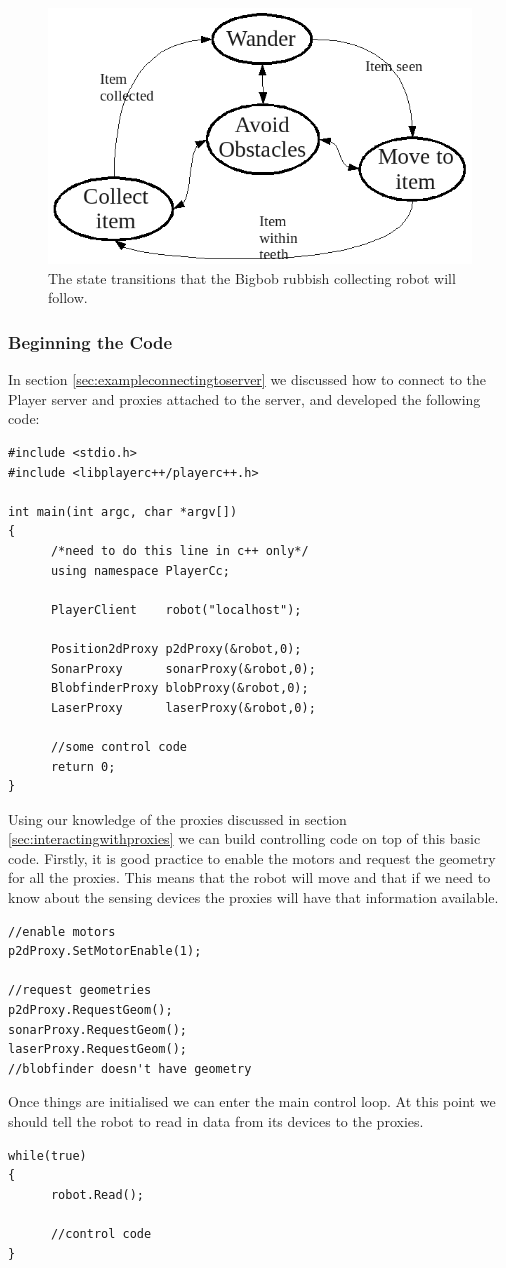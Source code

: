 \documentclass[a4paper]{report}
\newcommand{\pl}{Player\xspace}
\begin{document}
\begin{figure}
	\centering
	\includegraphics[width=\linewidth]{./pics/coding/arch_structureOA.png}
	\caption{The state transitions that the Bigbob rubbish collecting robot will follow.}
	\label{fig:archstructure}
\end{figure} 

\subsubsection{Beginning the Code}

In section \ref{sec:exampleconnectingtoserver} we discussed how to connect to the \pl server and proxies attached to the server, and developed the following code:
\begin{verbatim}
#include <stdio.h>
#include <libplayerc++/playerc++.h>

int main(int argc, char *argv[])
{
      /*need to do this line in c++ only*/
      using namespace PlayerCc;
	
      PlayerClient    robot("localhost");

      Position2dProxy p2dProxy(&robot,0);
      SonarProxy      sonarProxy(&robot,0);
      BlobfinderProxy blobProxy(&robot,0);
      LaserProxy      laserProxy(&robot,0);

      //some control code
      return 0;
}
\end{verbatim}
Using our knowledge of the proxies discussed in section \ref{sec:interactingwithproxies} we can build controlling code on top of this basic code. 
Firstly, it is good practice to enable the motors and request the geometry for all the proxies. This means that the robot will move and that if we need to know about the sensing devices the proxies will have that information available.
\begin{verbatim}
//enable motors
p2dProxy.SetMotorEnable(1);

//request geometries
p2dProxy.RequestGeom();
sonarProxy.RequestGeom();
laserProxy.RequestGeom();
//blobfinder doesn't have geometry
\end{verbatim}
Once things are initialised we can enter the main control loop. At this point we should tell the robot to read in data from its devices to the proxies.
\begin{verbatim}
while(true)
{
      robot.Read();

      //control code
}
\end{verbatim}
\end{document}
